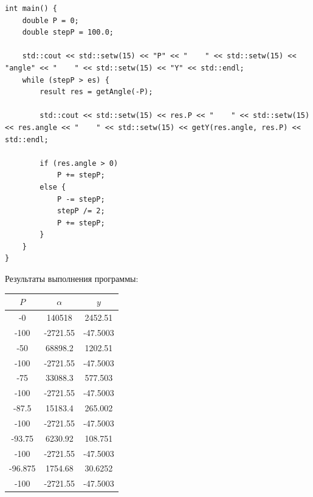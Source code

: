 \documentclass[a4paper,14pt]{extarticle}
\begin{document}
\begin{enumerate}[1. ]
\begin{verbatim}
int main() {
    double P = 0;
    double stepP = 100.0;

    std::cout << std::setw(15) << "P" << "    " << std::setw(15) << "angle" << "    " << std::setw(15) << "Y" << std::endl;
    while (stepP > es) {
        result res = getAngle(-P);
        
        std::cout << std::setw(15) << res.P << "    " << std::setw(15) << res.angle << "    " << std::setw(15) << getY(res.angle, res.P) << std::endl;

        if (res.angle > 0)
            P += stepP;
        else {
            P -= stepP;
            stepP /= 2;
            P += stepP;
        } 
    }
}
    \end{verbatim}
          Результаты выполнения программы:

          \begin{center}
              \begin{longtable}{|c|c|c|}
                  \hline
                  $P$      & $\alpha$     & $y$          \\
                  \hline
                  -0       & 140518       & 2452.51      \\
                  \hline
                  -100     & -2721.55     & -47.5003     \\
                  \hline
                  -50      & 68898.2      & 1202.51      \\
                  \hline
                  -100     & -2721.55     & -47.5003     \\
                  \hline
                  -75      & 33088.3      & 577.503      \\
                  \hline
                  -100     & -2721.55     & -47.5003     \\
                  \hline
                  -87.5    & 15183.4      & 265.002      \\
                  \hline
                  -100     & -2721.55     & -47.5003     \\
                  \hline
                  -93.75   & 6230.92      & 108.751      \\
                  \hline
                  -100     & -2721.55     & -47.5003     \\
                  \hline
                  -96.875  & 1754.68      & 30.6252      \\
                  \hline
                  -100     & -2721.55     & -47.5003     \\
                  \hline

\end{longtable}
\end{center}
\end{enumerate}
\end{document}
